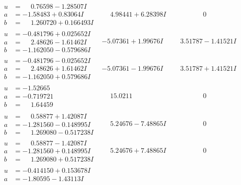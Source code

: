 \documentclass[1p]{elsarticle_modified}
\theoremstyle{definition}
\begin{document}
$$\begin{array}{c|c|c}
 \hline 
\begin{aligned}
u &= \phantom{-}0.76598 - 1.28507 I \\
a &= -1.58483 + 0.83064 I \\
b &= \phantom{-}1.260720 + 0.166493 I\end{aligned}
 & \phantom{-}4.98441 + 6.28398 I & \phantom{-0.000000 } 0 \\ \hline\begin{aligned}
u &= -0.481796 + 0.025652 I \\
a &= \phantom{-}2.48626 - 1.61462 I \\
b &= -1.162050 - 0.579686 I\end{aligned}
 & -5.07361 + 1.99676 I & \phantom{-}3.51787 - 1.41521 I \\ \hline\begin{aligned}
u &= -0.481796 - 0.025652 I \\
a &= \phantom{-}2.48626 + 1.61462 I \\
b &= -1.162050 + 0.579686 I\end{aligned}
 & -5.07361 - 1.99676 I & \phantom{-}3.51787 + 1.41521 I \\ \hline\begin{aligned}
u &= -1.52665\phantom{ +0.000000I} \\
a &= -0.719721\phantom{ +0.000000I} \\
b &= \phantom{-}1.64459\phantom{ +0.000000I}\end{aligned}
 & \phantom{-}15.0211\phantom{ +0.000000I} & \phantom{-0.000000 } 0 \\ \hline\begin{aligned}
u &= \phantom{-}0.58877 + 1.42087 I \\
a &= -1.281560 - 0.148995 I \\
b &= \phantom{-}1.269080 - 0.517238 I\end{aligned}
 & \phantom{-}5.24676 - 7.48865 I & \phantom{-0.000000 } 0 \\ \hline\begin{aligned}
u &= \phantom{-}0.58877 - 1.42087 I \\
a &= -1.281560 + 0.148995 I \\
b &= \phantom{-}1.269080 + 0.517238 I\end{aligned}
 & \phantom{-}5.24676 + 7.48865 I & \phantom{-0.000000 } 0 \\ \hline\begin{aligned}
u &= -0.414150 + 0.153678 I \\
a &= -1.80595 - 1.43113 I \\

\end{aligned}
\end{array}$$
\end{document}
